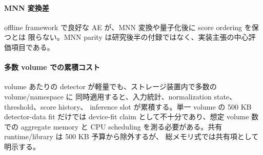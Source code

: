 \paragraph{MNN 変換差}
offline framework で良好な AE が、MNN 変換や量子化後に score ordering を保つとは
限らない。MNN parity は研究後半の付録ではなく、実装主張の中心評価項目である。

\paragraph{多数 volume での累積コスト}
volume あたりの detector が軽量でも、ストレージ装置内で多数の volume/namespace に
同時適用すると、入力統計、normalization state、threshold、score history、
inference slot が累積する。単一 volume の 500 KB detector-data fit だけでは
device-fit claim として不十分であり、想定 volume 数での aggregate memory と
CPU scheduling を測る必要がある。共有 runtime/library は 500 KB 予算から除外するが、
総メモリ式では共有項として明示する。
